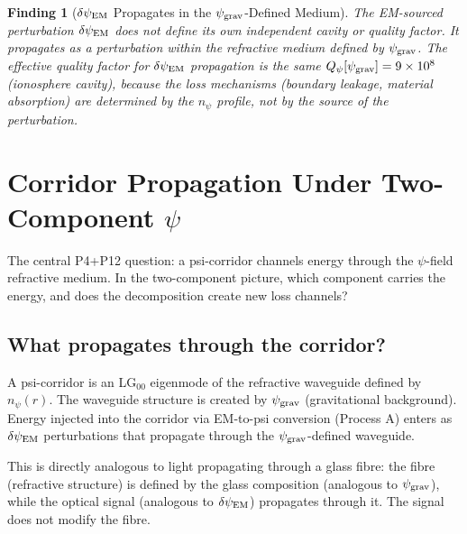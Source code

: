 \documentclass[11pt]{article}
\newtheorem{finding}{Finding}
\newcommand{\ee}[1]{\times 10^{#1}}
\newcommand{\psigrav}{\psi_{\rm grav}}
\newcommand{\dpsiEM}{\delta\psi_{\rm EM}}
\newcommand{\Qpsi}{Q_\psi}
\newcommand{\npsi}{n_\psi}
\begin{document}
\begin{finding}[$\dpsiEM$ Propagates in the $\psigrav$-Defined Medium]
\label{find:dpsi-propagation}
The EM-sourced perturbation $\dpsiEM$ does not define its own independent
cavity or quality factor. It propagates as a perturbation within the
refractive medium defined by $\psigrav$. The effective quality factor
for $\dpsiEM$ propagation is the same $\Qpsi[\psigrav] = 9\ee{8}$
(ionosphere cavity), because the loss mechanisms (boundary leakage,
material absorption) are determined by the $\npsi$ profile, not by the
source of the perturbation.
\end{finding}

\section{Corridor Propagation Under Two-Component $\psi$}
\label{sec:corridor}

The central P4+P12 question: a psi-corridor channels energy through the
$\psi$-field refractive medium. In the two-component picture, which
component carries the energy, and does the decomposition create new loss
channels?

\subsection{What propagates through the corridor?}

A psi-corridor is an LG$_{00}$ eigenmode of the refractive waveguide
defined by $\npsi(r)$. The waveguide structure is created by $\psigrav$
(gravitational background). Energy injected into the corridor via
EM-to-psi conversion (Process A) enters as $\dpsiEM$ perturbations that
propagate through the $\psigrav$-defined waveguide.

This is directly analogous to light propagating through a glass fibre:
the fibre (refractive structure) is defined by the glass composition
(analogous to $\psigrav$), while the optical signal (analogous to $\dpsiEM$)
propagates through it. The signal does not modify the fibre.
\end{document}
